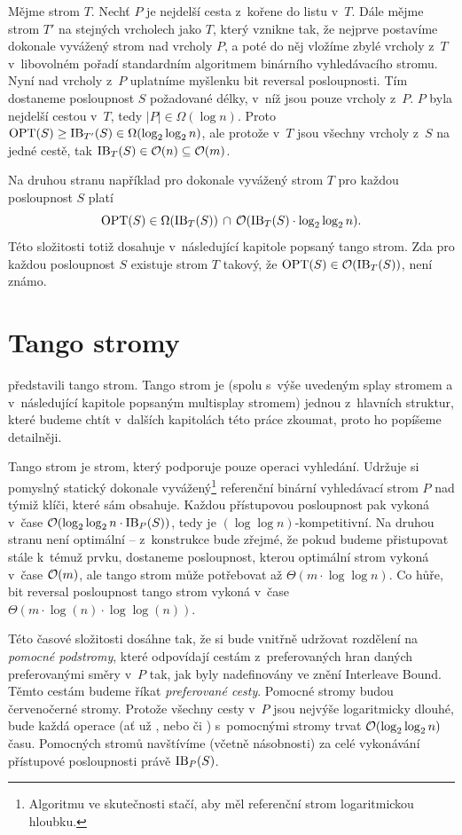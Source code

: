 \begin{dukaz}
Mějme strom $T$. Nechť $P$ je nejdelší cesta z~kořene do listu v~$T$. Dále
mějme strom $T'$ na stejných vrcholech jako $T$, který vznikne tak, že nejprve
postavíme dokonale vyvážený strom nad vrcholy $P$, a poté do něj vložíme zbylé
vrcholy z~$T$ v~libovolném pořadí standardním algoritmem binárního
vyhledávacího stromu. Nyní nad vrcholy z~$P$ uplatníme myšlenku bit reversal
posloupnosti. Tím dostaneme posloupnost $S$ požadované délky, v~níž jsou pouze
vrcholy z~$P$. $P$ byla nejdelší cestou v~$T$, tedy $|P|\in \Omega(\log n)$.
Proto $\opt(S)\geq \ib_{T'}(S) \in \Omega (\log\log n)$, ale protože v~$T$ jsou
všechny vrcholy z~$S$ na jedné cestě, tak $\operatorname{IB}_T(S) \in \mathcal O(n) \subseteq \mathcal O(m)$.
\end{dukaz}

Na druhou stranu například pro dokonale vyvážený strom $T$ pro každou
posloupnost $S$ platí $$\opt(S) \in \Omega(\ib_T(S))\, \cap\,
\o(\ib_T(S)\cdot\log\log n).$$ Této složitosti totiž dosahuje v~následující
kapitole popsaný tango strom.  Zda pro každou posloupnost $S$ existuje
strom $T$ takový, že $\operatorname{OPT}(S)\in\mathcal O(\operatorname{IB}_T(S))$, není známo.  

\section{Tango stromy}\label{sec:tango}

\citet{tango} představili tango strom. Tango strom je (spolu s~výše uvedeným
splay stromem a v~následující kapitole popsaným multisplay stromem) jednou
z~hlavních struktur, které budeme chtít v~dalších kapitolách této práce zkoumat,
proto ho popíšeme detailněji.

Tango strom je strom, který podporuje pouze operaci vyhledání. Udržuje si
pomyslný statický dokonale vyvážený\footnote{Algoritmu ve skutečnosti stačí,
aby měl referenční strom logaritmickou hloubku.} referenční binární vyhledávací
strom $P$ nad týmiž klíči, které sám obsahuje. Každou přístupovou
posloupnost pak vykoná v~čase $\o(\log\log n\cdot \ib_P(S))$, tedy je
$(\log\log n)$-kompetitivní. Na druhou stranu není optimální -- z~konstrukce
bude zřejmé, že pokud budeme přistupovat stále k~témuž prvku, dostaneme posloupnost, kterou optimální strom
 vykoná v~čase $\mathcal O(m)$, ale tango strom může potřebovat až
$\Theta(m\cdot\log\log n )$. Co hůře, bit reversal posloupnost tango strom vykoná v~čase $\Theta(m\cdot\log(n)\cdot \log\log(n))$.

Této časové složitosti dosáhne tak, že si bude vnitřně udržovat rozdělení na
\emph{pomocné podstromy}, které odpovídají cestám z~preferovaných hran daných
preferovanými směry v~$P$ tak, jak byly nadefinovány ve znění Interleave Bound.
Těmto cestám budeme říkat \emph{preferované cesty}. Pomocné stromy budou červenočerné stromy. Protože všechny cesty v~$P$
jsou nejvýše logaritmicky dlouhé, bude každá operace (ať už , nebo 
či ) s~pomocnými stromy trvat $\o(\log\log n)$ času. Pomocných stromů
navštívíme (včetně násobnosti) za celé vykonávání přístupové posloupnosti právě
$\operatorname{IB}_P(S)$.

